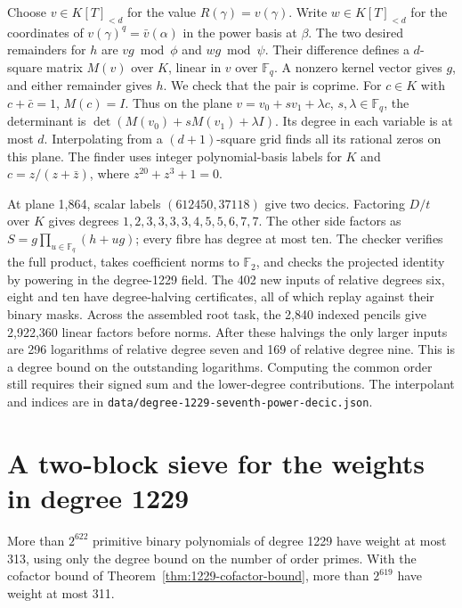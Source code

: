 \documentclass[11pt]{article}
\begin{document}
Choose \(v\in K[T]_{<d}\) for the value \(R(\gamma)=v(\gamma)\).
Write \(w\in K[T]_{<d}\) for the coordinates of
\(v(\gamma)^q=\bar v(\alpha)\) in the power basis at \(\beta\).
The two desired remainders for \(h\) are \(vg\bmod\phi\) and
\(wg\bmod\psi\). Their difference defines a \(d\)-square matrix
\(M(v)\) over \(K\), linear in \(v\) over \(\mathbb F_q\). A nonzero
kernel vector gives \(g\), and either remainder gives \(h\). We check
that the pair is coprime. For \(c\in K\) with \(c+\bar c=1\),
\(M(c)=I\). Thus on the plane \(v=v_0+s v_1+\lambda c\),
\(s,\lambda\in\mathbb F_q\), the determinant is
\(\det(M(v_0)+sM(v_1)+\lambda I)\). Its degree in each variable is
at most \(d\). Interpolating from a \((d+1)\)-square grid finds all
its rational zeros on this plane. The finder uses integer polynomial-basis
labels for \(K\) and \(c=z/(z+\bar z)\), where \(z^{20}+z^3+1=0\).

At plane 1,864, scalar labels \((612450,37118)\) give two decics.
Factoring \(D/t\) over \(K\) gives degrees
\(1,2,3,3,3,3,4,5,5,6,7,7\). The other side factors as
\(S=g\prod_{u\in\mathbb F_q}(h+ug)\); every fibre has degree at
most ten. The checker verifies the full product, takes coefficient
norms to \(\mathbb F_2\), and checks the projected identity by
powering in the degree-1229 field. The 402 new inputs of relative
degrees six, eight and ten have degree-halving certificates, all of
which replay against their binary masks. Across the assembled root
task, the 2,840 indexed pencils give 2,922,360 linear factors before
norms. After these halvings the only larger inputs are 296 logarithms
of relative degree seven and 169 of relative degree nine. This is a
degree bound on the outstanding logarithms. Computing the common
order still requires their signed sum and the lower-degree contributions.
The interpolant and indices are in
\nolinkurl{data/degree-1229-seventh-power-decic.json}.

\section{A two-block sieve for the weights in degree 1229}
\label{sec:paired-weight}
More than \(2^{622}\) primitive binary polynomials of degree 1229 have
weight at most 313, using only the degree bound on the number of order
primes. With the cofactor bound of Theorem~\ref{thm:1229-cofactor-bound},
more than \(2^{619}\) have weight at most 311.
\end{document}

